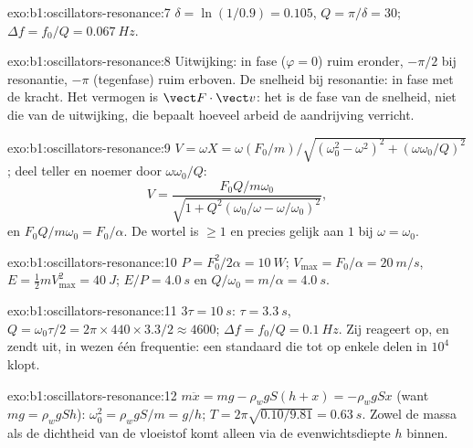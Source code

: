 \begin{solution}{exo:b1:oscillators-resonance:7}
$\delta = \ln(1/0.9) = 0.105$, $Q = \pi/\delta = 30$; $\Delta f = f_0/Q =
\qty{0.067}{Hz}$.
\end{solution}

\begin{solution}{exo:b1:oscillators-resonance:8}
Uitwijking: in fase ($\varphi = 0$) ruim eronder, $-\pi/2$ bij
resonantie, $-\pi$ (tegenfase) ruim erboven. De snelheid bij resonantie: in
fase met de kracht. Het vermogen is $\vect F\cdot\vect v$: het is de fase van de snelheid,
niet die van de uitwijking, die bepaalt hoeveel arbeid de aandrijving
verricht.
\end{solution}

\begin{solution}{exo:b1:oscillators-resonance:9}
$V = \omega X = \omega(F_0/m)/\sqrt{(\omega_0^2 - \omega^2)^2 + (\omega\omega_0/Q)^2}$;
deel teller en noemer door $\omega\omega_0/Q$:
\[
V = \frac{F_0Q/m\omega_0}{\sqrt{1 + Q^2(\omega_0/\omega - \omega/\omega_0)^2}},
\]
en $F_0Q/m\omega_0 = F_0/\alpha$.
De wortel is $\geq 1$ en precies gelijk aan $1$ bij $\omega = \omega_0$.
\end{solution}

\begin{solution}{exo:b1:oscillators-resonance:10}
$P = F_0^2/2\alpha = \qty{10}{W}$; $V_{\max} = F_0/\alpha = \qty{20}{m/s}$,
$E = \tfrac12 mV_{\max}^2 = \qty{40}{J}$; $E/P = \qty{4.0}{s}$ en $Q/\omega_0 =
m/\alpha = \qty{4.0}{s}$.
\end{solution}

\begin{solution}{exo:b1:oscillators-resonance:11}
$3\tau = \qty{10}{s}$: $\tau = \qty{3.3}{s}$, $Q = \omega_0\tau/2 = 2\pi \times
440 \times 3.3/2 \approx 4600$; $\Delta f = f_0/Q = \qty{0.1}{Hz}$. Zij
reageert op, en zendt uit, in wezen één frequentie: een standaard die tot op
enkele delen in $10^4$ klopt.
\end{solution}

\begin{solution}{exo:b1:oscillators-resonance:12}
$m\ddot x = mg - \rho_wgS(h + x) = -\rho_wgSx$ (want $mg = \rho_wgSh$):
$\omega_0^2 = \rho_wgS/m = g/h$; $T = 2\pi\sqrt{0.10/9.81} = \qty{0.63}{s}$.
Zowel de massa als de dichtheid van de vloeistof komt alleen via de
evenwichtsdiepte $h$ binnen.
\end{solution}

